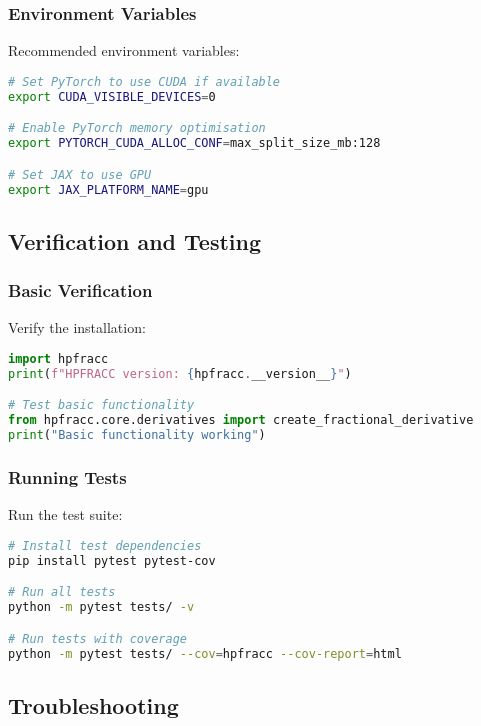\subsubsection{Environment Variables}
Recommended environment variables:

\begin{lstlisting}[language=bash, caption=Environment Variables]
# Set PyTorch to use CUDA if available
export CUDA_VISIBLE_DEVICES=0

# Enable PyTorch memory optimisation
export PYTORCH_CUDA_ALLOC_CONF=max_split_size_mb:128

# Set JAX to use GPU
export JAX_PLATFORM_NAME=gpu
\end{lstlisting}

\subsection{Verification and Testing}

\subsubsection{Basic Verification}
Verify the installation:

\begin{lstlisting}[language=python, caption=Installation Verification]
import hpfracc
print(f"HPFRACC version: {hpfracc.__version__}")

# Test basic functionality
from hpfracc.core.derivatives import create_fractional_derivative
print("Basic functionality working")
\end{lstlisting}

\subsubsection{Running Tests}
Run the test suite:

\begin{lstlisting}[language=bash, caption=Running Tests]
# Install test dependencies
pip install pytest pytest-cov

# Run all tests
python -m pytest tests/ -v

# Run tests with coverage
python -m pytest tests/ --cov=hpfracc --cov-report=html
\end{lstlisting}

\subsection{Troubleshooting}

